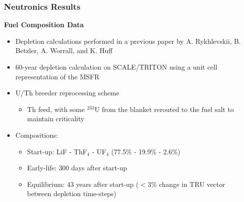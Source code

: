 \begin{frame}
	\frametitle{Neutronics Results}
		\textbf{Fuel Composition Data}
			\begin{itemize}
				\item Depletion calculations performed in a previous paper by
				A. Rykhlevskii, B. Betzler, A. Worrall, and K. Huff
				\cite{rykhlevskii_fuel_2019}
				\item 60-year depletion calculation on SCALE/TRITON
				using a unit cell representation of the \gls{MSFR}
				\item U/Th breeder reprocessing scheme
				\begin{itemize}
					\item Th feed, with some $^{233}$U from the blanket rerouted
					to the fuel salt to maintain criticality
				\end{itemize}
				\item Compositions:
				\begin{itemize}
					\item Start-up: LiF - ThF$_4$
					- UF$_4$ (77.5\% - 19.9\% - 2.6\%)
					\item Early-life: 300 days after start-up
					\item Equilibrium: 43 years after start-up
					($<$3\% change in TRU vector between depletion
					time-steps)
				\end{itemize}
			\end{itemize}
\end{frame}

